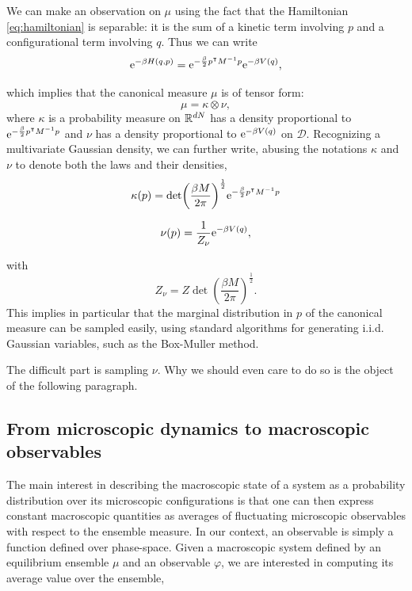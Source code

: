 \begin{remark}
We can make an observation on $\mu$ using the fact that the Hamiltonian \ref{eq:hamiltonian} is separable: it is the sum of a kinetic term involving $p$ and a configurational term involving $q$. Thus we can write
$$\mathrm{e}^{-\beta H(q,p)}=\mathrm{e}^{-\frac\beta 2p^\intercal M^{-1}p}\mathrm{e}^{-\beta V(q)},$$


which implies that the canonical measure $\mu$ is of tensor form: 
$$\mu = \kappa \otimes \nu, $$
where $\kappa$ is a probability measure on $\mathbb{R}^{dN}$ has a density proportional to $\mathrm{e}^{-\frac\beta 2p^\intercal M^{-1}p}$ and $\nu$ has a density proportional to $\mathrm{e}^{-\beta V(q)}$ on $\mathcal D$.
Recognizing a multivariate Gaussian density, we can further write, abusing the notations $\kappa$ and $\nu$ to denote both the laws and their densities,
\begin{equation}
    \label{eq:kappa_marginal}
    \kappa(p)=\det(\frac{\beta M}{2\pi})^{\frac 12}\mathrm{e}^{-\frac\beta2p^\intercal M^{-1}p}
\end{equation}

\begin{equation}
    \label{eq:nu_marginal}
    \nu(p)=\frac1{Z_\nu}\mathrm{e}^{-\beta V(q)},
\end{equation}

with $$ Z_\nu= Z\det(\frac{\beta M}{2\pi})^{\frac 12}.$$
This implies in particular that the marginal distribution in $p$ of the canonical measure can be sampled easily, using standard algorithms for generating i.i.d. Gaussian variables, such as the Box-Muller method.
\end{remark}

The difficult part is sampling $\nu$. Why we should even care to do so is the object of the following paragraph.

\subsection{From microscopic dynamics to macroscopic observables}
The main interest in describing the macroscopic state of a system as a probability distribution over its microscopic configurations is that one can then express constant macroscopic quantities as averages of fluctuating microscopic observables with respect to the ensemble measure.
In our context, an observable is simply a function defined over phase-space. Given a macroscopic system defined by an equilibrium ensemble $\mu$ and an observable $\varphi$, we are interested in computing its average value over the ensemble,

